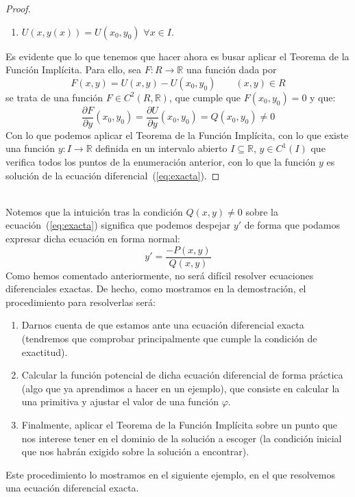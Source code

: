 \begin{prop}
\begin{proof}
\begin{enumerate}
            \item $U(x,y(x))=U(x_0,y_0)$ $\forall x\in I$.
        \end{enumerate}
        Es evidente que lo que tenemos que hacer ahora es busar aplicar el Teorema de la Función Implícita. Para ello, sea $F:R\rightarrow\mathbb{R}$ una función dada por
        \begin{equation*}
            F(x,y) = U(x,y) - U(x_0,y_0) \qquad (x,y)\in R
        \end{equation*}
        se trata de una función $F\in C^2(R,\mathbb{R})$, que cumple que $F(x_0,y_0)=0$ y que:
        \begin{equation*}
            \dfrac{\partial F}{\partial y}(x_0,y_0) = \dfrac{\partial U}{\partial y}(x_0,y_0) = Q(x_0,y_0) \neq 0
        \end{equation*}
        Con lo que podemos aplicar el Teorema de la Función Implícita, con lo que existe una función $y:I\rightarrow\mathbb{R}$ definida en un intervalo abierto $I\subseteq \mathbb{R}$, $y\in C^1(I)$ que verifica todos los puntos de la enumeración anterior, con lo que la función $y$ es solución de la ecuación diferencial~(\ref{eq:exacta}).
    \end{proof}
\end{prop}~\\

\noindent
Notemos que la intuición tras la condición $Q(x,y)\neq 0$ sobre la ecuación~(\ref{eq:exacta}) significa que podemos despejar $y'$ de forma que podamos expresar dicha ecuación en forma normal:
\begin{equation*}
    y' = \dfrac{-P(x,y)}{Q(x,y)}
\end{equation*}
Como hemos comentado anteriormente, no será difícil resolver ecuaciones diferenciales exactas. De hecho, como mostramos en la demostración, el procedimiento para resolverlas será:
\begin{enumerate}
    \item Darnos cuenta de que estamos ante una ecuación diferencial exacta (tendremos que comprobar principalmente que cumple la condición de exactitud).
    \item Calcular la función potencial de dicha ecuación diferencial de forma práctica (algo que ya aprendimos a hacer en un ejemplo), que consiste en calcular la una primitiva y ajustar el valor de una función $\varphi$.
    \item Finalmente, aplicar el Teorema de la Función Implícita sobre un punto que nos interese tener en el dominio de la solución a escoger (la condición inicial que nos habrán exigido sobre la solución a encontrar).
\end{enumerate}
Este procedimiento lo mostramos en el siguiente ejemplo, en el que resolvemos una ecuación diferencial exacta.

